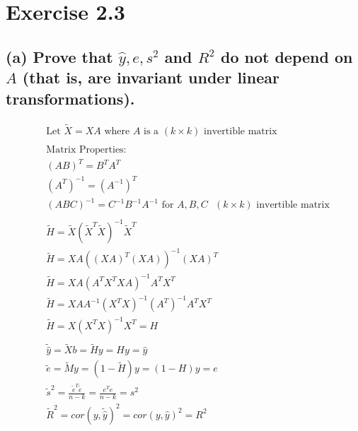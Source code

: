 \documentclass[12pt, a4paper]{article}
\begin{document}
\section*{Exercise 2.3}
\vspace{1em}


\subsection*{(a) Prove that $\hat{y}, e, s^2$ and $R^2$ do not depend on $A$ (that is, are invariant under linear transformations).}
\begin{align*}
    &\text{Let }\tilde{X} = XA \text{ where $A$ is a $(k \times k)$ invertible matrix}\\\\
    &\text{Matrix Properties:}\\
    &(AB)^T = B^TA^T\\
    &(A^T)^{-1} = (A^{-1})^T\\
    &(ABC)^{-1} = C^{-1}B^{-1}A^{-1} \text{ for $A, B, C$ $(k \times k)$ invertible matrix}\\\\
    &\tilde{H} = \tilde{X}(\tilde{X}^T\tilde{X})^{-1}\tilde{X}^T\\
    &\tilde{H} = XA((XA)^T(XA))^{-1}(XA)^T\\
    &\tilde{H} = XA(A^TX^TXA)^{-1}A^TX^T\\
    &\tilde{H} = XAA^{-1}(X^TX)^{-1}(A^T)^{-1}A^TX^T\\
    &\tilde{H} = X(X^TX)^{-1}X^T = H\\\\
    &\tilde{\hat{y}} = \tilde{X}b = \tilde{H}y = Hy = \hat{y}\\
    &\tilde{e} = \tilde{M}y = (1 -\tilde{H})y = (1 - H)y = e\\
    &\tilde{s}^2 = \frac{\tilde{e}^T\tilde{e}}{n-k} = \frac{e^Te}{n-k} = s^2\\
    &\tilde{R}^2 = cor(y, \tilde{\hat{y}})^2 = cor(y, \hat{y})^2 = R^2
\end{align*}
\vspace{1em}
\end{document}
